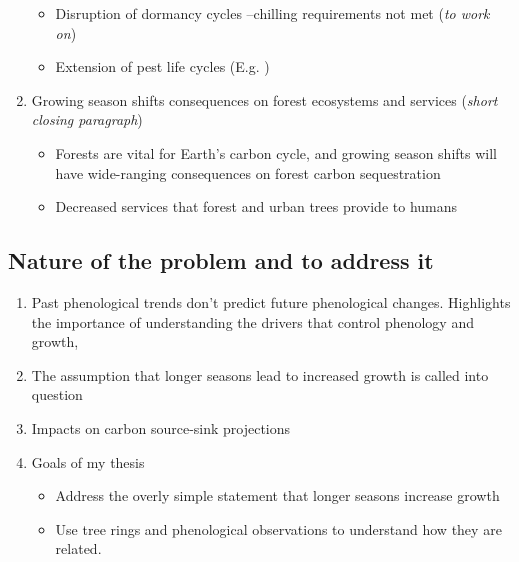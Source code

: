 \documentclass{article}
\begin{document}
\begin{enumerate}
\begin {itemize}
				\item Disruption of dormancy cycles --chilling requirements not met (\textit{to work on})
				\item Extension of pest life cycles (E.g. \cite{bentz_western_2023})
			\end {itemize}
	\item Growing season shifts consequences on forest ecosystems and services (\textit{short closing paragraph})
		\begin {itemize}
			\item Forests are vital for Earth's carbon cycle, and growing season shifts will have wide-ranging consequences on forest carbon sequestration 
			\item Decreased services that forest and urban trees provide to humans
		\end {itemize}
\end{enumerate}

\subsection{Nature of the problem and to address it}  %
\begin{enumerate}
	\item Past phenological trends don't predict future phenological changes. Highlights the importance of understanding the drivers that control phenology and growth,
	\item The assumption that longer seasons lead to increased growth is called into question
	\item Impacts on carbon source-sink projections
	\item Goals of my thesis
		\begin{itemize}
			\item Address the overly simple statement that longer seasons increase growth 
			\item Use tree rings and phenological observations to understand how they are related.
		\end{itemize}
\end{enumerate} %
\end{document}
